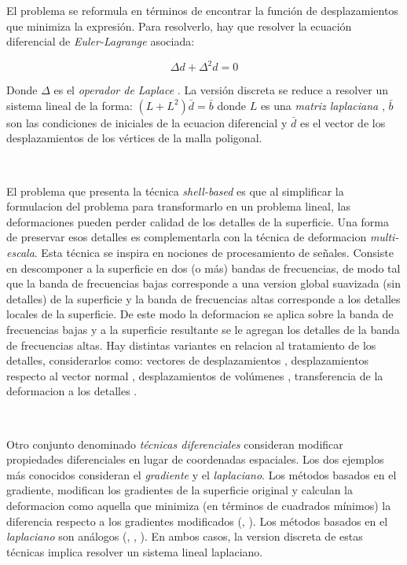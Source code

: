 \documentclass{article}
\begin{document}
El problema se reformula en términos de encontrar la función de 
desplazamientos que minimiza la expresión. Para resolverlo, hay 
que resolver la ecuación diferencial de \emph{Euler-Lagrange} asociada:

$$\Delta d + \Delta^2 d = 0$$

Donde $\Delta$ es el \emph{operador de Laplace} \cite{E:1998}. La versión 
discreta se reduce a resolver un sistema lineal de la 
forma: $(L + L^2) \bar d = \bar b$ donde $L$ es una \emph{matriz laplaciana} 
\cite{B:2013}, $\bar b$ son las condiciones de iniciales de la ecuacion diferencial 
y $\bar d$ es el vector de los desplazamientos de los vértices de la malla 
poligonal.

\

El problema que presenta la técnica \emph{shell-based} es que al simplificar 
la formulacion del problema para transformarlo en un problema lineal, las 
deformaciones pueden perder calidad de los detalles de la superficie. Una 
forma de preservar esos detalles es complementarla con la técnica de deformacion 
\emph{multi-escala}. Esta técnica se inspira en nociones de procesamiento 
de señales. Consiste en descomponer a la superficie en dos (o más) bandas 
de frecuencias, de modo tal que la banda de frecuencias bajas corresponde 
a una version global suavizada (sin detalles) de la superficie y la banda 
de frecuencias altas corresponde a los detalles locales de la superficie. 
De este modo la deformacion se aplica sobre la banda de frecuencias bajas 
y a la superficie resultante se le agregan los detalles de la banda de 
frecuencias altas. Hay distintas variantes en relacion al tratamiento 
de los detalles, considerarlos como: vectores de desplazamientos \cite{K:1998}, 
desplazamientos respecto al vector normal \cite{K:1999}, desplazamientos de 
volúmenes \cite{BK:2003b}, transferencia de la deformacion a los detalles 
\cite{B:2006}.

\

Otro conjunto denominado \emph{técnicas diferenciales} consideran modificar 
propiedades diferenciales en lugar de coordenadas espaciales. Los dos ejemplos 
más conocidos consideran el \emph{gradiente} y el \emph{laplaciano}. Los 
métodos basados en el gradiente, modifican 
los gradientes de la superficie original y calculan la deformacion como  
aquella que minimiza (en términos de cuadrados mínimos) la diferencia respecto 
a los gradientes modificados (\cite{Y:2004}, \cite{Z:2005}). Los métodos 
basados en el \emph{laplaciano} son análogos (\cite{L:2004}, \cite{S:2004}, 
\cite{ZH:2005}). En ambos casos, la version discreta de estas técnicas implica 
resolver un sistema lineal laplaciano. 
\end{document}
